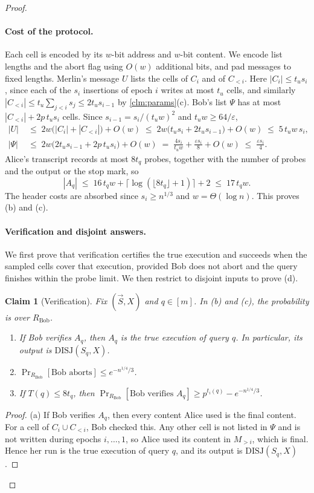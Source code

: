\documentclass[11pt]{article}
\theoremstyle{plain}
\newtheorem{claim}[theorem]{Claim}
\theoremstyle{definition}
\theoremstyle{remark}
\newcommand{\eps}{\varepsilon}
\newcommand{\abs}[1]{\left|#1\right|}
\newcommand{\DISJ}{\mathrm{DISJ}}
\newcommand{\vS}{\vec{S}}
\begin{document}
\begin{proof}
\paragraph{Cost of the protocol.} Each cell is encoded by its $w$-bit address and $w$-bit content. We encode list lengths and the abort flag using $O(w)$ additional bits, and pad messages to fixed lengths. Merlin's message $U$ lists the cells of $C_i$ and of $C_{<i}$. Here $\abs{C_i} \le t_u s_i$, since each of the $s_i$ insertions of epoch $i$ writes at most $t_u$ cells, and similarly $\abs{C_{<i}} \le t_u \sum_{j<i} s_j \le 2 t_u s_{i-1}$ by \cref{clm:params}(c). Bob's list $\Psi$ has at most $\abs{C_{<i}} + 2p\, t_u s_i$ cells. Since $s_{i-1} = s_i/(t_u w)^2$ and $t_u w \ge 64/\eps$,
\begin{align*}
\abs{U} \;&\le\; 2w\big(\abs{C_i} + \abs{C_{<i}}\big) + O(w) \;\le\; 2w\big(t_u s_i + 2 t_u s_{i-1}\big) + O(w) \;\le\; 5\, t_u w\, s_i, \\
\abs{\Psi} \;&\le\; 2w\big(2 t_u s_{i-1} + 2p\, t_u s_i\big) + O(w) \;=\; \frac{4 s_i}{t_u w} + \frac{\eps s_i}{8} + O(w) \;\le\; \frac{\eps s_i}{4}.
\end{align*}
Alice's transcript records at most $8 t_q$ probes, together with the number of probes and the output or the stop mark, so
\[ \abs{A_q} \;\le\; 16\, t_q w + \lceil\log(\lfloor8 t_q\rfloor + 1)\rceil + 2 \;\le\; 17\, t_q w. \]
The header costs are absorbed since $s_i\ge n^{1/3}$ and $w=\Theta(\log n)$. This proves (b) and (c).

\paragraph{Verification and disjoint answers.} We first prove that verification certifies the true execution and succeeds when the sampled cells cover that execution, provided Bob does not abort and the query finishes within the probe limit. We then restrict to disjoint inputs to prove (d).

\begin{claim}[Verification]\label{lem:simulation}
Fix $(\vS, X)$ and $q \in [m]$. In (b) and (c), the probability is over $R_{\mathrm{Bob}}$.
\begin{enumerate}[label=(\alph*)]
  \item If Bob verifies $A_q$, then $A_q$ is the true execution of query $q$. In particular, its output is $\DISJ(S_q, X)$.
  \item $\Pr_{R_{\mathrm{Bob}}}[\text{Bob aborts}] \le e^{-n^{1/4}/3}$.
  \item If $T(q) \le 8 t_q$, then $\Pr_{R_{\mathrm{Bob}}}[\text{Bob verifies } A_q] \ge p^{t_i(q)} - e^{-n^{1/4}/3}$.
\end{enumerate}
\end{claim}
\begin{proof}
(a) If Bob verifies $A_q$, then every content Alice used is the final content. For a cell of $C_i \cup C_{<i}$, Bob checked this. Any other cell is not listed in $\Psi$ and is not written during epochs $i, \dots, 1$, so Alice used its content in $M_{>i}$, which is final. Hence her run is the true execution of query $q$, and its output is $\DISJ(S_q, X)$.


\end{proof}
\end{proof}
\end{document}
